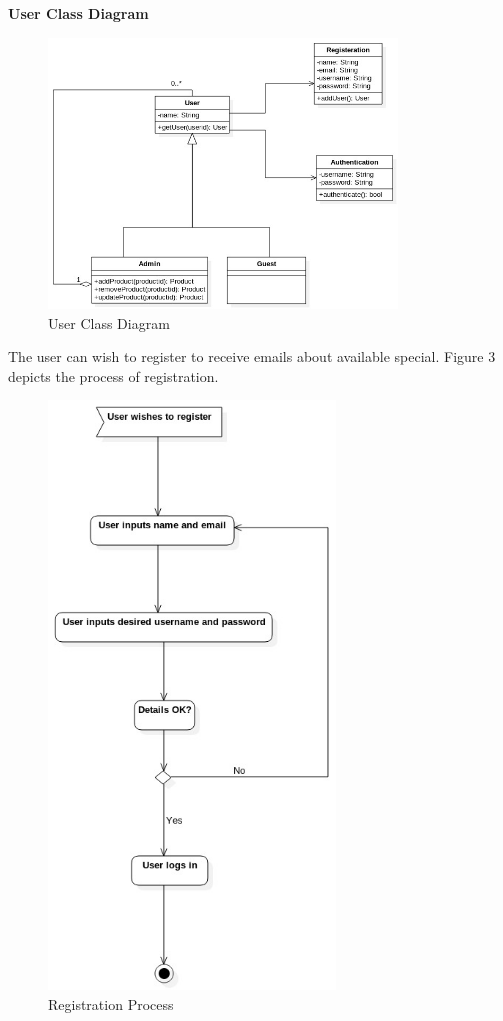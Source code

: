 \documentclass[12pt,a4paper]{article}
\begin{document}
\textbf{User Class Diagram}
\begin{figure}[!ht]
\includegraphics[width=350px]{Diagrams/userclassdiagram.jpg}
\caption{User Class Diagram}
\end{figure}\newpage
The user can wish to register to receive emails about available special. Figure 3 depicts the process of registration.
\begin{figure}[!ht]
\includegraphics[width=3in]{Diagrams/registerActivityDiagram.jpg}
\caption{Registration Process}
\end{figure} \newpage
\end{document}
